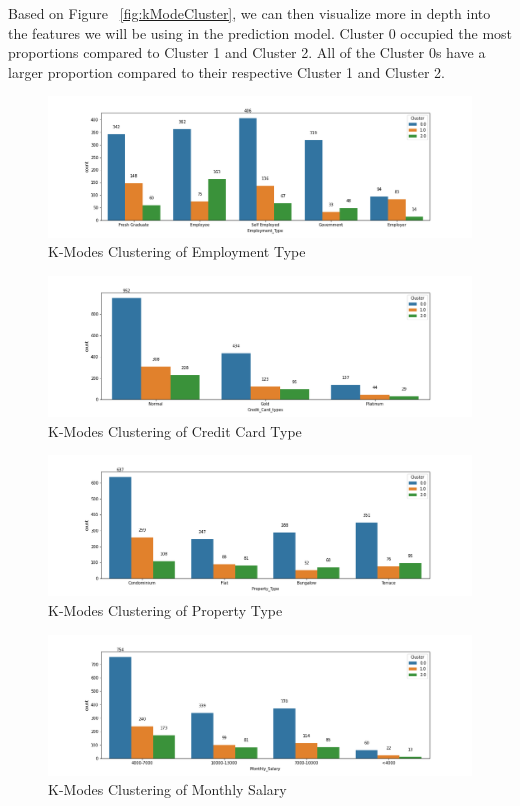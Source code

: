 \documentclass[11pt]{article}
\begin{document}
Based on Figure ~\ref{fig:kModeCluster}, we can then visualize more in depth into the features we will be using in the prediction model. Cluster 0 occupied the most proportions compared to Cluster 1 and Cluster 2. All of the Cluster 0s have a larger proportion compared to their respective Cluster 1 and Cluster 2.
\begin{figure}[h]
\centerline{\includegraphics[scale=0.5]{kmode_employ.png}}
\label{fig:kModeEmploy}
\caption{K-Modes Clustering of Employment Type}
\end{figure}
\begin{figure}[h]
\centerline{\includegraphics[scale=0.5]{kmode_ccard.png}}
\label{fig:kModeEmploy}
\caption{K-Modes Clustering of Credit Card Type}
\end{figure}
\begin{figure}[h]
\centerline{\includegraphics[scale=0.5]{kmode_property.png}}
\label{fig:kModeEmploy}
\caption{K-Modes Clustering of Property Type}
\end{figure}
\begin{figure}[h]
\centerline{\includegraphics[scale=0.5]{kmode_salary.png}}
\label{fig:kModeEmploy}
\caption{K-Modes Clustering of Monthly Salary}
\end{figure}
\end{document}
